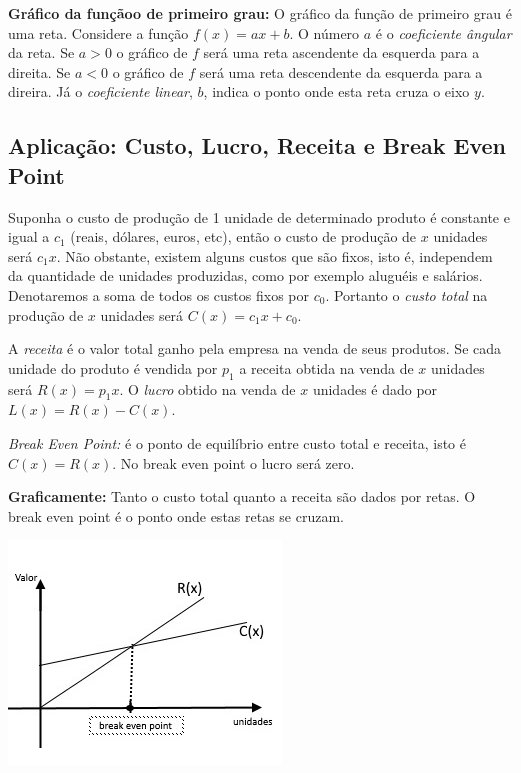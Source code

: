 \noindent\textbf{Gráfico da funçãoo de primeiro grau:} O gráfico da função de primeiro grau é
uma reta. Considere a função $f(x)=ax+b$. O número $a$ é o \textit{coeficiente ângular} da reta.
Se $a>0$ o gráfico de $f$ será uma reta
ascendente da esquerda para a direita. Se $a<0$ o gráfico de $f$ será uma reta descendente da esquerda para a direira.
Já o \textit{coeficiente linear}, $b$, indica o ponto onde esta reta cruza o eixo $y$.

\subsection{Aplicação: Custo, Lucro, Receita e Break Even Point}

Suponha o custo de produção de 1 unidade de determinado produto é constante e igual a $c_1$ (reais, dólares, euros, etc), então o custo de produção de $x$ unidades será $c_1x$. Não obstante, existem alguns custos que são fixos, isto é, independem
da quantidade de unidades produzidas, como por exemplo aluguéis e salários. Denotaremos a soma de todos os custos fixos por $c_0$. Portanto o \textit{custo total} na produção de $x$ unidades
será  $C(x)=c_1x+c_0.$


A \textit{receita} é o valor total ganho pela empresa na venda de seus produtos. Se cada unidade do produto é vendida por $p_1$
a receita obtida na venda de $x$ unidades será $R(x)=p_1x$. O \textit{lucro} obtido na venda de $x$ unidades é dado por $L(x)=R(x)-C(x)$.

\noindent\textit{Break Even Point:} é o ponto de equilíbrio entre custo total e receita, isto é $C(x)=R(x)$. No break even point o lucro será zero.


\noindent\textbf{Graficamente:} Tanto o custo total quanto a receita são dados por retas. O break even point é o ponto onde estas retas se cruzam.


\begin{center}
\includegraphics{./chapters/preliminares/imgs/breakeven}
\end{center}


